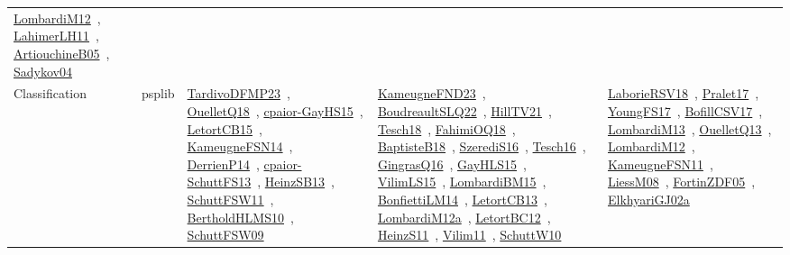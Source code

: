 {\begin{longtable}{lp{3cm}>{\raggedright\arraybackslash}p{6cm}>{\raggedright\arraybackslash}p{6cm}>{\raggedright\arraybackslash}p{8cm}}
\href{articles/LombardiM12.pdf}{LombardiM12}~\cite{LombardiM12}, \href{papers/LahimerLH11.pdf}{LahimerLH11}~\cite{LahimerLH11}, \href{papers/ArtiouchineB05.pdf}{ArtiouchineB05}~\cite{ArtiouchineB05}, \href{papers/Sadykov04.pdf}{Sadykov04}~\cite{Sadykov04}\\
Classification & psplib & \href{papers/TardivoDFMP23.pdf}{TardivoDFMP23}~\cite{TardivoDFMP23}, \href{papers/OuelletQ18.pdf}{OuelletQ18}~\cite{OuelletQ18}, \href{papers/cpaior-GayHS15.pdf}{cpaior-GayHS15}~\cite{cpaior-GayHS15}, \href{articles/LetortCB15.pdf}{LetortCB15}~\cite{LetortCB15}, \href{articles/KameugneFSN14.pdf}{KameugneFSN14}~\cite{KameugneFSN14}, \href{papers/DerrienP14.pdf}{DerrienP14}~\cite{DerrienP14}, \href{papers/cpaior-SchuttFS13.pdf}{cpaior-SchuttFS13}~\cite{cpaior-SchuttFS13}, \href{articles/HeinzSB13.pdf}{HeinzSB13}~\cite{HeinzSB13}, \href{articles/SchuttFSW11.pdf}{SchuttFSW11}~\cite{SchuttFSW11}, \href{papers/BertholdHLMS10.pdf}{BertholdHLMS10}~\cite{BertholdHLMS10}, \href{papers/SchuttFSW09.pdf}{SchuttFSW09}~\cite{SchuttFSW09} & \href{papers/KameugneFND23.pdf}{KameugneFND23}~\cite{KameugneFND23}, \href{papers/BoudreaultSLQ22.pdf}{BoudreaultSLQ22}~\cite{BoudreaultSLQ22}, \href{papers/HillTV21.pdf}{HillTV21}~\cite{HillTV21}, \href{papers/Tesch18.pdf}{Tesch18}~\cite{Tesch18}, \href{articles/FahimiOQ18.pdf}{FahimiOQ18}~\cite{FahimiOQ18}, \href{articles/BaptisteB18.pdf}{BaptisteB18}~\cite{BaptisteB18}, \href{papers/SzerediS16.pdf}{SzerediS16}~\cite{SzerediS16}, \href{papers/Tesch16.pdf}{Tesch16}~\cite{Tesch16}, \href{papers/GingrasQ16.pdf}{GingrasQ16}~\cite{GingrasQ16}, \href{papers/GayHLS15.pdf}{GayHLS15}~\cite{GayHLS15}, \href{papers/VilimLS15.pdf}{VilimLS15}~\cite{VilimLS15}, \href{papers/LombardiBM15.pdf}{LombardiBM15}~\cite{LombardiBM15}, \href{papers/BonfiettiLM14.pdf}{BonfiettiLM14}~\cite{BonfiettiLM14}, \href{papers/LetortCB13.pdf}{LetortCB13}~\cite{LetortCB13}, \href{articles/LombardiM12a.pdf}{LombardiM12a}~\cite{LombardiM12a}, \href{papers/LetortBC12.pdf}{LetortBC12}~\cite{LetortBC12}, \href{papers/HeinzS11.pdf}{HeinzS11}~\cite{HeinzS11}, \href{papers/Vilim11.pdf}{Vilim11}~\cite{Vilim11}, \href{papers/SchuttW10.pdf}{SchuttW10}~\cite{SchuttW10} & \href{articles/LaborieRSV18.pdf}{LaborieRSV18}~\cite{LaborieRSV18}, \href{papers/Pralet17.pdf}{Pralet17}~\cite{Pralet17}, \href{papers/YoungFS17.pdf}{YoungFS17}~\cite{YoungFS17}, \href{papers/BofillCSV17.pdf}{BofillCSV17}~\cite{BofillCSV17}, \href{papers/LombardiM13.pdf}{LombardiM13}~\cite{LombardiM13}, \href{papers/OuelletQ13.pdf}{OuelletQ13}~\cite{OuelletQ13}, \href{articles/LombardiM12.pdf}{LombardiM12}~\cite{LombardiM12}, \href{papers/KameugneFSN11.pdf}{KameugneFSN11}~\cite{KameugneFSN11}, \href{articles/LiessM08.pdf}{LiessM08}~\cite{LiessM08}, \href{papers/FortinZDF05.pdf}{FortinZDF05}~\cite{FortinZDF05}, \href{papers/ElkhyariGJ02a.pdf}{ElkhyariGJ02a}~\cite{ElkhyariGJ02a}\\

\end{longtable}}
